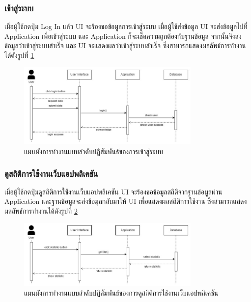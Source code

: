 \documentclass[12pt,oneside,openright,a4paper]{cpe-thai-project}
\begin{document}
\subsubsection{เข้าสู่ระบบ}
\hspace{1cm}
เมื่อผู้ใช้กดปุ่ม Log In แล้ว UI จะร้องขอข้อมูลการเข้าสู่ระบบ เมื่อผู้ใช้ส่งข้อมูล UI จะส่งข้อมูลไปที่ Application
เพื่อเข้าสู่ระบบ และ Application ก็จะเช็คความถูกต้องกับฐานข้อมูล จากนั้นจึงส่งข้อมูลว่าเข้าสู่ระบบสำเร็จ
และ UI จะแสดงผลว่าเข้าสู่ระบบสำเร็จ ซึ่งสามารถแสดงผลลัพธ์การทำงานได้ดังรูปที่ \ref{fig:S_LogIn}
\begin{figure}[!h]\centering
	\includegraphics[width=0.8\textwidth, keepaspectratio=true]{image/chap3/sequence/Login.jpg}
	\caption{แผนผังการทำงานแบบลำดับปฏิสัมพันธ์ของการเข้าสู่ระบบ}\label{fig:S_LogIn}
\end{figure}

\pagebreak
\subsubsection{ดูสถิติการใช้งานเว็บแอปพลิเคชัน}
\hspace{1cm}
เมื่อผู้ใช้กดปุ่มดูสถิติการใช้งานเว็บแอปพลิเคชัน UI จะร้องขอข้อมูลสถิติจากฐานข้อมูลผ่าน Application
และฐานข้อมูลจะส่งข้อมูลกลับมาให้ UI เพื่อแสดงผลสถิติการใช้งาน ซึ่งสามารถแสดงผลลัพธ์การทำงานได้ดังรูปที่ \ref{fig:S_Statistic}
\begin{figure}[!h]\centering
	\includegraphics[width=0.8\textwidth, keepaspectratio=true]{image/chap3/sequence/Statistic.jpg}
	\caption{แผนผังการทำงานแบบลำดับปฏิสัมพันธ์ของการดูสถิติการใช้งานเว็บแอปพลิเคชัน}\label{fig:S_Statistic}
\end{figure}
\end{document}
